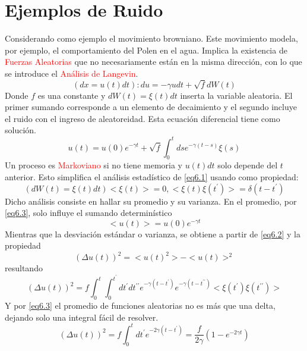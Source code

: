 \documentclass{book}
\begin{document}
\section{Ejemplos de Ruido}
Considerando como ejemplo el movimiento browniano. Este movimiento modela, por ejemplo, el comportamiento del Polen en el agua. Implica la existencia de \textcolor{red}{Fuerzas Aleatorias} que no necesariamente están en la misma dirección, con lo que se introduce el \textcolor{red}{Análisis de Langevin}.
\begin{equation}\label{eq6.1}(dx=u(t)dt): du=-\gamma u dt +\sqrt{f}dW(t)\end{equation} Donde $f$ es una constante y $dW(t)=\xi(t) dt$ inserta la variable aleatoria. El primer sumando corresponde a un elemento de decaimiento y el segundo incluye el ruido con el ingreso de aleatoreidad.
Esta ecuación diferencial tiene como solución.
\begin{equation}\label{eq6.2} u(t)=u(0)e^{-\gamma t}+\sqrt{f}\int_0^t ds e^{-\gamma(t-s)}\xi(s)\end{equation}
Un proceso es \textcolor{red}{Markoviano} si no tiene memoria y $u(t)dt$ solo depende del $t$ anterior. Esto simplifica el análisis estadístico de \ref{eq6.1} usando como propiedad:
\begin{equation}\label{eq6.3}(dW(t)=\xi(t)dt) <\xi(t)>=0, <\xi(t)\xi(t^\prime)>=\delta(t-t^\prime) \end{equation}
Dicho análisis consiste en hallar su promedio y su varianza. En el promedio, por \ref{eq6.3}, solo influye el sumando determinístico
\begin{equation}\label{eq6.4}<u(t)>=u(0)e^{-\gamma t}\end{equation}
Mientras que la desviación estándar o varianza, se obtiene a partir de \ref{eq6.2} y la propiedad
\begin{equation}\label{eq6.5}(\Delta u(t))^2=<u(t)^2>-<u(t)>^2\end{equation}
resultando
\begin{equation}\label{eq6.6}(\Delta u(t))^2=f\int_0^t\int_0^{t^\prime}dt^\prime dt^{\prime\prime} e^{-\gamma(t-t^\prime)}e^{-\gamma(t-t^{\prime\prime})}<\xi(t^\prime)\xi(t^{\prime \prime})>\end{equation}
Y por \ref{eq6.3} el promedio de funciones aleatorias no es más que una delta, dejando solo una integral fácil de resolver.
\begin{equation}\label{eq6.7}(\Delta u(t))^2=f\int_0^t dt^\prime e^{-2\gamma(t-t^\prime)}=\frac{f}{2\gamma}(1-e^{-2\gamma t}) \end{equation}
\end{document}
